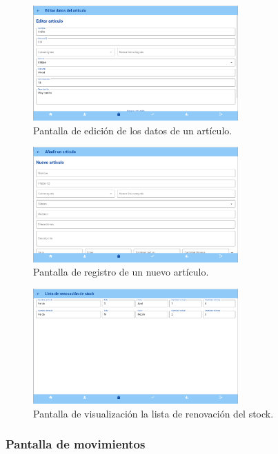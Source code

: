 \begin{figure}[H]
	\centering
	\includegraphics[width=0.7\textwidth]{imagenes/TerceraIteracion/articleEdit.png}
	\caption{Pantalla de edición de los datos de un artículo.}
\end{figure}

\begin{figure}[H]
	\centering
	\includegraphics[width=0.7\textwidth]{imagenes/TerceraIteracion/newArticle.png}
	\caption{Pantalla de registro de un nuevo artículo.}
\end{figure}

\begin{figure}[H]
	\centering
	\includegraphics[width=0.7\textwidth]{imagenes/TerceraIteracion/stock.png}
	\caption{Pantalla de visualización la lista de renovación del stock.}
\end{figure}

\subsubsection{Pantalla de movimientos}


